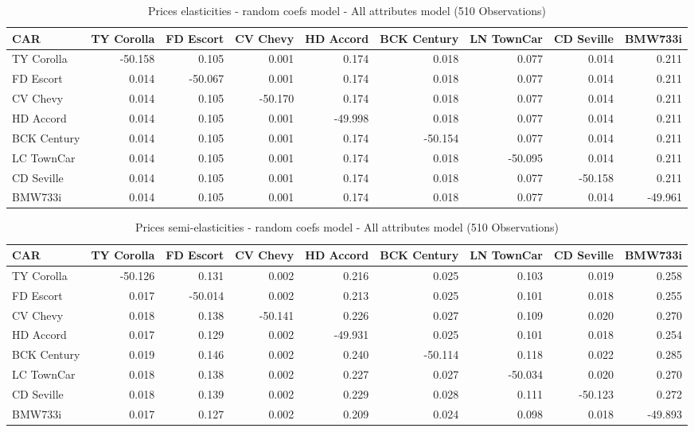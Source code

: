 \documentclass{article}\usepackage[]{graphicx}\usepackage[]{color}
\begin{document}
%
\begin{table}[ht]
\centering
\caption{Prices elasticities - random coefs model - All attributes model 
 (510 Observations)} 
\label{tbl:all_elasticities}
\begingroup\footnotesize
\begin{tabular}{lrrrrrrrr}
  \toprule 
 CAR & TY Corolla & FD Escort & CV Chevy & HD Accord &  BCK Century & LN TownCar & CD Seville & BMW733i \\
 \midrule 
 TY Corolla & -50.158 & 0.105 & 0.001 & 0.174 & 0.018 & 0.077 & 0.014 & 0.211 \\ 
  FD Escort & 0.014 & -50.067 & 0.001 & 0.174 & 0.018 & 0.077 & 0.014 & 0.211 \\ 
  CV Chevy & 0.014 & 0.105 & -50.170 & 0.174 & 0.018 & 0.077 & 0.014 & 0.211 \\ 
  HD Accord & 0.014 & 0.105 & 0.001 & -49.998 & 0.018 & 0.077 & 0.014 & 0.211 \\ 
  BCK Century & 0.014 & 0.105 & 0.001 & 0.174 & -50.154 & 0.077 & 0.014 & 0.211 \\ 
  LC TownCar & 0.014 & 0.105 & 0.001 & 0.174 & 0.018 & -50.095 & 0.014 & 0.211 \\ 
  CD Seville & 0.014 & 0.105 & 0.001 & 0.174 & 0.018 & 0.077 & -50.158 & 0.211 \\ 
  BMW733i & 0.014 & 0.105 & 0.001 & 0.174 & 0.018 & 0.077 & 0.014 & -49.961 \\ 
   \bottomrule 
\end{tabular}
\endgroup
\end{table}

%
\begin{table}[ht]
\centering
\caption{Prices semi-elasticities -  random coefs model - All attributes model 
 (510 Observations)} 
\label{tbl:all1_elasticities}
\begingroup\footnotesize
\begin{tabular}{lrrrrrrrr}
  \toprule 
 CAR & TY Corolla & FD Escort & CV Chevy & HD Accord &  BCK Century & LN TownCar & CD Seville & BMW733i \\
 \midrule 
 TY Corolla & -50.126 & 0.131 & 0.002 & 0.216 & 0.025 & 0.103 & 0.019 & 0.258 \\ 
  FD Escort & 0.017 & -50.014 & 0.002 & 0.213 & 0.025 & 0.101 & 0.018 & 0.255 \\ 
  CV Chevy & 0.018 & 0.138 & -50.141 & 0.226 & 0.027 & 0.109 & 0.020 & 0.270 \\ 
  HD Accord & 0.017 & 0.129 & 0.002 & -49.931 & 0.025 & 0.101 & 0.018 & 0.254 \\ 
  BCK Century & 0.019 & 0.146 & 0.002 & 0.240 & -50.114 & 0.118 & 0.022 & 0.285 \\ 
  LC TownCar & 0.018 & 0.138 & 0.002 & 0.227 & 0.027 & -50.034 & 0.020 & 0.270 \\ 
  CD Seville & 0.018 & 0.139 & 0.002 & 0.229 & 0.028 & 0.111 & -50.123 & 0.272 \\ 
  BMW733i & 0.017 & 0.127 & 0.002 & 0.209 & 0.024 & 0.098 & 0.018 & -49.893 \\ 
   \bottomrule 
\end{tabular}
\endgroup
\end{table}
\end{document}
